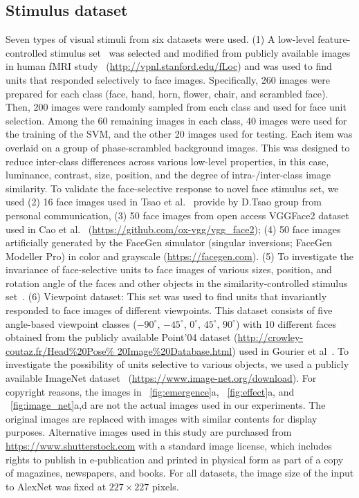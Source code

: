\documentclass[sn-mathphys-num]{sn-jnl}%
\theoremstyle{thmstyleone}%
\theoremstyle{thmstyletwo}%
\theoremstyle{thmstylethree}%
\begin{document}
\subsection{Stimulus dataset}
Seven types of visual stimuli from six datasets were used.
(1) A low-level feature-controlled stimulus set~\cite{stigliani2015temporal} was selected and modified from publicly available images in human fMRI study~\cite{stigliani2015temporal} (\url{http://vpnl.stanford.edu/fLoc}) 
and was used to find units that responded selectively to face images.
Specifically, 260 images were prepared for each class (face, hand, horn, flower, chair, and scrambled face).
Then, 200 images were randomly sampled from each class and used for face unit selection.
Among the 60 remaining images in each class, 40 images were used for the training of the SVM, 
and the other 20 images used for testing.
Each item was overlaid on a group of phase-scrambled background images.
This was designed to reduce inter-class differences across various low-level properties,
in this case, luminance, contrast, size, position, and the degree of intra-/inter-class image similarity.
To validate the face-selective response to novel face stimulus set, we used (2) 16 face images used in Tsao et al.~\cite{tsao2006cortical,freiwald2010functional} provide by D.Tsao group from personal communication,
(3) 50 face images from open access VGGFace2 dataset used in Cao et al.~\cite{cao2018vggface2} (\url{https://github.com/ox-vgg/vgg_face2});
(4) 50 face images artificially generated by the FaceGen simulator (singular inversions; FaceGen Modeller Pro) in color and grayscale (\url{https://facegen.com}).
(5) To investigate the invariance of face-selective units to face images of various sizes, position, and rotation angle of the faces and other objects in the similarity-controlled stimulus set~\cite{stigliani2015temporal}.
(6) Viewpoint dataset: This set was used to find units that invariantly responded to face images of different viewpoints.
This dataset consists of five angle-based viewpoint classes ($ -90^\circ $, $ -45^\circ $, $ 0^\circ $, $ 45^\circ $, $ 90^\circ $) with 10 different faces obtained from the publicly available Point'04 dataset (\url{http://crowley-coutaz.fr/Head%20Pose%	20Image%20Database.html}) used in Gourier et al~\cite{gourier2004estimating}.
To investigate the possibility of units selective to various objects, we used a publicly available ImageNet dataset~\cite{russakovsky2015imagenet} (\url{https://www.image-net.org/download}).
For copyright reasons, the images in ~\ref{fig:emergence}a, ~\ref{fig:effect}a, and ~\ref{fig:image_net}a,d are not the actual images used in our experiments.
The original images are replaced with images with similar contents for display purposes.
Alternative images used in this study are purchased from \url{https://www.shutterstock.com} with a standard image license, which includes rights to publish in e-publication and printed in physical form as part of a copy of magazines, newspapers, and books.
For all datasets, the image size of the input to AlexNet was fixed at $ 227 \times 227 $ pixels.
\end{document}
